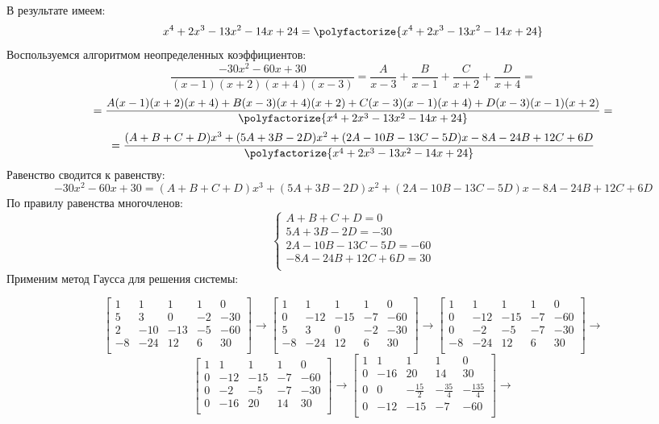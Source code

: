 \documentclass[a4paper]{article}
\begin{document}
В результате имеем:
\[x^4+2x^3-13x^2-14x+24=\polyfactorize{x^4+2x^3-13x^2-14x+24}\]
Воспользуемся алгоритмом неопределенных коэффициентов:
\[\frac{-30x^2-60x+30}{(x-1)(x+2)(x+4)(x-3)}=\frac{A}{x-3}+\frac{B}{x-1}+\frac{C}{x+2}+\frac{D}{x+4}=\]
\[=\frac{A(x-1)(x+2)(x+4)+B(x-3)(x+4)(x+2)+C(x-3)(x-1)(x+4)+D(x-3)(x-1)(x+2)}{\polyfactorize{x^4+2x^3-13x^2-14x+24}}=\]
\[=\frac{(A+B+C+D)x^3+(5A+3B-2D)x^2+(2A-10B-13C-5D)x-8A-24B+12C+6D}{\polyfactorize{x^4+2x^3-13x^2-14x+24}}\]
Равенство сводится к равенству:
\[-30x^2-60x+30=(A+B+C+D)x^3+(5A+3B-2D)x^2+(2A-10B-13C-5D)x-8A-24B+12C+6D\]
По правилу равенства многочленов:
\begin{equation*}
 \begin{cases}
	A+B+C+D=0 \\
	5A+3B-2D=-30 \\
	2A-10B-13C-5D=-60 \\
	-8A-24B+12C+6D=30 \\
 \end{cases}
\end{equation*}
Применим метод Гаусса для решения системы: \par
\[
\left[
\begin{array}{cccc|c}
	1 & 1 & 1 & 1 & 0 \\ 
	5 & 3 & 0 & -2 & -30 \\
	2 & -10 & -13 & -5 & -60\\
	-8 & -24 & 12 & 6 & 30\\ 
\end{array}
\right]
\to
\left[
\begin{array}{cccc|c}
	1 & 1 & 1 & 1 & 0 \\ 
	0 & -12 & -15 & -7 & -60 \\
	5 & 3 & 0 & -2 & -30 \\
	-8 & -24 & 12 & 6 & 30 \\ 
\end{array}
\right]
\to
\left[
\begin{array}{cccc|c}
	1 & 1 & 1 & 1 & 0 \\ 
	0 & -12 & -15 & -7 & -60 \\
	0 & -2 & -5 & -7 & -30 \\
	-8 & -24 & 12 & 6 & 30 \\ 	
\end{array}
\right]
\to\]
\[
\left[
\begin{array}{cccc|c}
	1 & 1 & 1 & 1 & 0 \\ 
	0 & -12 & -15 & -7 & -60 \\
	0 & -2 & -5 & -7 & -30 \\
	0 & -16 & 20 & 14 & 30 \\ 		
\end{array}
\right]
\to
\left[
\begin{array}{cccc|c}
	1 & 1 & 1 & 1 & 0 \\ 
	0 & -16 & 20 & 14 & 30 \\ 
	0 & 0 & -\frac{15}{2} & -\frac{35}{4} & -\frac{135}{4} \\
	0 & -12 & -15 & -7 & -60 \\		
\end{array}
\right]
\to\]
\end{document}
